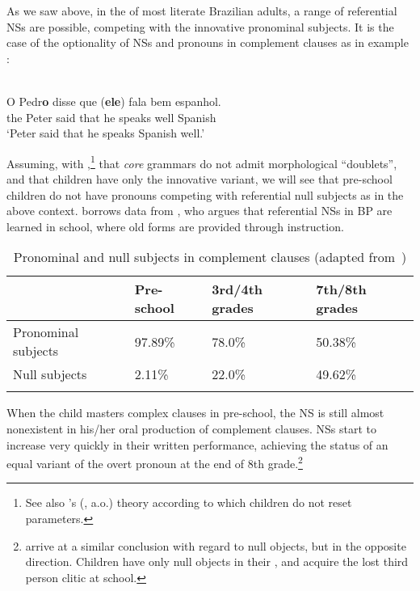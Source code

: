 \documentclass[output=paper]{langsci/langscibook}
\begin{document}
As we saw above, in the  of most literate Brazilian adults, a range
of referential NSs are possible, competing with the innovative pronominal
subjects. It is the case of the optionality of NSs and pronouns in complement
clauses as in example :

\ea%
    \label{ex:15/2}\\
	\gll	O Pedr\textbf{o} disse que (\textbf{ele}) fala bem     espanhol.\\
            the Peter said that \hphantom{(}he speaks well  Spanish\\
	\glt	\enquote*{Peter said that  he speaks Spanish well.}
\z

Assuming, with \citet{Kato2011},\footnote{See also \citeauthor{Dresher1999}'s
(\citeyear{Dresher1999}, a.o.) theory according to which children do not reset
parameters.} that \emph{core} grammars do not admit morphological “doublets”,
and that children have only the innovative variant, we will see that pre-school
children do not have pronouns competing with referential null subjects as in
the above context. \citeauthor{Kato2011} borrows data from
\textcite{Magalhaes2003}, who argues that referential NSs in
\gls{BP} are learned in school, where old forms are
provided through instruction.\largerpage[1]

\begin{table}[htpb]
    \centering
    \begin{tabularx}{\textwidth}{lXXX}
    \lsptoprule
                         & Pre-school & 3rd/4th grades & 7th/8th grades\\
    \midrule
    Pronominal subjects & 97.89\%    & 78.0\%         & 50.38\%\\
    Null subjects       & 2.11\%     & 22.0\%         & 49.62\%\\
    \lspbottomrule
    \end{tabularx}
    \caption{Pronominal and null subjects in complement clauses (adapted
    from~\citealt{Magalhaes2003})}\label{tab:26.2}
\end{table}

When the child masters complex clauses in pre-school, the NS is still almost
nonexistent in his/her oral production of complement clauses. NSs start to
increase very quickly in their written performance, achieving the status of an
equal variant of the overt pronoun at the end of 8th
grade.\footnote{\citet{KatoEtAl2009} arrive at a similar conclusion
    with regard to null objects, but in the opposite direction. Children have
    only null objects in their , and acquire
    the lost third person
clitic at school.}
\end{document}

